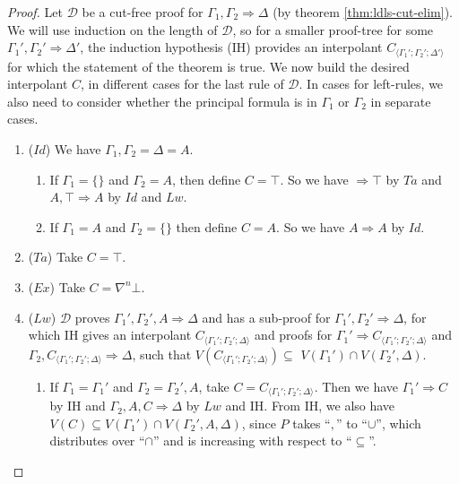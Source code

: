 \documentclass[12pt,a4paper]{article}
\theoremstyle{plain}
\theoremstyle{definition}
\begin{document}
\begin{proof}
Let $\mathcal{D}$ be a cut-free proof for $\Gamma_1 , \Gamma_2 \Rightarrow \Delta$ (by theorem \ref{thm:ldls-cut-elim}). We will use induction on the length of $\mathcal{D}$, so for a smaller proof-tree for some $\Gamma_1' , \Gamma_2' \Rightarrow \Delta'$, the induction hypothesis (IH) provides an interpolant $C_{\langle\Gamma_1'; \Gamma_2'; \Delta'\rangle}$ for which the statement of the theorem is true. We now build the desired interpolant $C$, in different cases for the last rule of $\mathcal{D}$. In cases for left-rules, we also need to consider whether the principal formula is in $\Gamma_1$ or $\Gamma_2$ in separate cases.
\begin{enumerate}
	\item ($Id$) We have $\Gamma_1,\Gamma_2 = \Delta = A$.
	\begin{enumerate}
		\item If $\Gamma_1 = \{\}$ and $\Gamma_2 = A$, then define $C = \top$. So we have $\Rightarrow \top$ by $Ta$ and $A , \top \Rightarrow A$ by $Id$ and $Lw$.
		
		\item If $\Gamma_1 = A$ and $\Gamma_2 = \{\}$ then define $C = A$. So we have $A \Rightarrow A$ by $Id$.
	\end{enumerate}
	\item ($Ta$) Take $C = \top$.
	
	\item ($Ex$) Take $C = \nabla^n \bot$.
	
	\item ($Lw$) $\mathcal{D}$ proves $\Gamma_1' , \Gamma_2' , A \Rightarrow \Delta$ and has a sub-proof for $\Gamma_1' , \Gamma_2' \Rightarrow \Delta$, for which IH gives an interpolant $C_{\langle\Gamma_1';\Gamma_2';\Delta\rangle}$ and proofs for $\Gamma_1' \Rightarrow C_{\langle\Gamma_1';\Gamma_2';\Delta\rangle}$ and $\Gamma_2 , C_{\langle\Gamma_1';\Gamma_2';\Delta\rangle} \Rightarrow \Delta$, such that $V(C_{\langle\Gamma_1';\Gamma_2';\Delta\rangle}) \subseteq$ $ V(\Gamma_1') \cap V(\Gamma_2' , \Delta)$.
	\begin{enumerate}
		\item If $\Gamma_1 = \Gamma_1'$ and $\Gamma_2 = \Gamma_2' , A$, take $C = C_{\langle\Gamma_1';\Gamma_2';\Delta\rangle}$. Then we have  $\Gamma_1' \Rightarrow C$ by IH and $\Gamma_2 , A , C \Rightarrow \Delta$ by $Lw$ and IH. From IH, we also have $V(C) \subseteq V(\Gamma_1') \cap V(\Gamma_2' , A , \Delta)$, since $P$ takes ``$,$'' to ``$\cup$'', which distributes over ``$\cap$'' and is increasing with respect to ``$\subseteq$''.
		

\end{enumerate}
\end{enumerate}
\end{proof}
\end{document}
